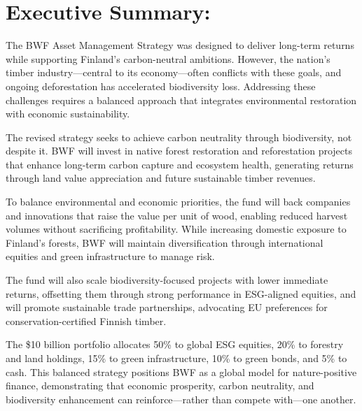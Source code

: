 

\section*{Executive Summary:}

\par The BWF Asset Management Strategy was designed to deliver long-term returns while supporting Finland’s carbon-neutral ambitions. However, the nation’s timber industry—central to its economy—often conflicts with these goals, and ongoing deforestation has accelerated biodiversity loss. Addressing these challenges requires a balanced approach that integrates environmental restoration with economic sustainability.
\par The revised strategy seeks to achieve carbon neutrality through biodiversity, not despite it. BWF will invest in native forest restoration and reforestation projects that enhance long-term carbon capture and ecosystem health, generating returns through land value appreciation and future sustainable timber revenues.
\par To balance environmental and economic priorities, the fund will back companies and innovations that raise the value per unit of wood, enabling reduced harvest volumes without sacrificing profitability. While increasing domestic exposure to Finland’s forests, BWF will maintain diversification through international equities and green infrastructure to manage risk.
\par The fund will also scale biodiversity-focused projects with lower immediate returns, offsetting them through strong performance in ESG-aligned equities, and will promote sustainable trade partnerships, advocating EU preferences for conservation-certified Finnish timber.
\par The \$10 billion portfolio allocates 50\% to global ESG equities, 20\% to forestry and land holdings, 15\% to green infrastructure, 10\% to green bonds, and 5\% to cash.
This balanced strategy positions BWF as a global model for nature-positive finance, demonstrating that economic prosperity, carbon neutrality, and biodiversity enhancement can reinforce—rather than compete with—one another.
